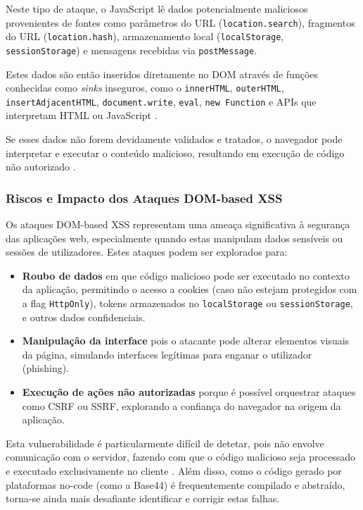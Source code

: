 Neste tipo de ataque, o JavaScript lê dados potencialmente maliciosos provenientes de fontes como parâmetros do URL (\texttt{location.search}), fragmentos do URL (\texttt{location.hash}), armazenamento local (\texttt{localStorage}, \texttt{sessionStorage}) e mensagens recebidas via \texttt{postMessage}.

Estes dados são então inseridos diretamente no DOM através de funções conhecidas como \textit{sinks} inseguros, como o \texttt{innerHTML}, \texttt{outerHTML}, \texttt{insertAdjacentHTML}, \texttt{document.write}, \texttt{eval}, \texttt{new Function} e APIs que interpretam HTML ou JavaScript \cite{ref31}.

Se esses dados não forem devidamente validados e tratados, o navegador pode interpretar e executar o conteúdo malicioso, resultando em execução de código não autorizado \cite{ref29}.

\subsubsection{Riscos e Impacto dos Ataques DOM-based XSS}
\label{subsubsec:riscos-impacto-dom-xss}

Os ataques DOM-based XSS representam uma ameaça significativa à segurança das aplicações web, especialmente quando estas manipulam dados sensíveis ou sessões de utilizadores. Estes ataques podem ser explorados para:

\begin{itemize}
    \item \textbf{Roubo de dados} em que código malicioso pode ser executado no contexto da aplicação, permitindo o acesso a cookies (caso não estejam protegidos com a flag \texttt{HttpOnly}), tokens armazenados no \texttt{localStorage} ou \texttt{sessionStorage}, e outros dados confidenciais.
    
    \item \textbf{Manipulação da interface} pois o atacante pode alterar elementos visuais da página, simulando interfaces legítimas para enganar o utilizador (phishing).
    
    \item \textbf{Execução de ações não autorizadas} porque é possível orquestrar ataques como CSRF ou SSRF, explorando a confiança do navegador na origem da aplicação.
\end{itemize}

Esta vulnerabilidade é particularmente difícil de detetar, pois não envolve comunicação com o servidor, fazendo com que o código malicioso seja processado e executado exclusivamente no cliente \cite{ref30}. Além disso, como o código gerado por plataformas no-code (como a Base44) é frequentemente compilado e abstraído, torna-se ainda mais desafiante identificar e corrigir estas falhas.

